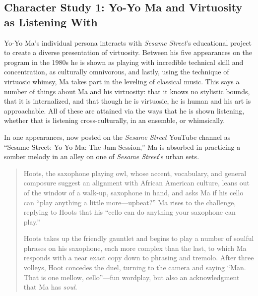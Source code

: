 \documentclass[12pt,letterpaper]{article}
\newcommand{\ses}{\textit{Sesame Street }}
\begin{document}
	\subsection*{Character Study 1: Yo-Yo Ma and Virtuosity as 
	Listening With} 

	Yo-Yo Ma's individual persona interacts with \textit{Sesame Street}'s
	educational project to create a diverse presentation of virtuosity. 
	Between his five appearances on the program in the 1980s he is shown as 
	playing with incredible technical skill and concentration, as 
	culturally omnivorous, and lastly, using the technique of virtuosic 
	whimsy, Ma 
	takes part in the leveling of classical music. This says a number of 
	things about Ma and his virtuosity: that it knows no stylistic bounds,
	that it is internalized, and that though he is virtuosic, he is 
	human
	and his art is approachable. All of these are attained via the ways
	that he is shown listening, whether that is listening 
	cross-culturally, in an ensemble, or whimsically.  
	
	In one appearances, now posted on the 
	\ses YouTube channel as ``Sesame Street: Yo Yo Ma: The Jam Session,'' 
	Ma is absorbed in practicing a somber melody in an alley on one of 
	\textit{Sesame Street}'s urban sets.

	\begin{quote}	
	Hoots, the saxophone playing owl, whose accent, vocabulary, and general
	composure suggest an alignment with African American culture, leans out
	of the window of a walk-up, saxophone in hand, and asks Ma if his cello
	can ``play anything a little more---upbeat?'' Ma rises to the challenge,
	replying to Hoots that his ``cello can do anything your saxophone can 
	play.''

	Hoots takes up the friendly gauntlet and begins to play a number of 
	soulful phrases on his saxophone, each more complex than the last, to 
	which Ma responds with a near exact copy down to phrasing and tremolo. 
	After three volleys, Hoot concedes the duel, turning to the camera and 
	saying ``Man. That is one mellow, cello''---fun wordplay, but also an 
	acknowledgment that Ma has \textit{soul}.

	\end{quote}
\end{document}
